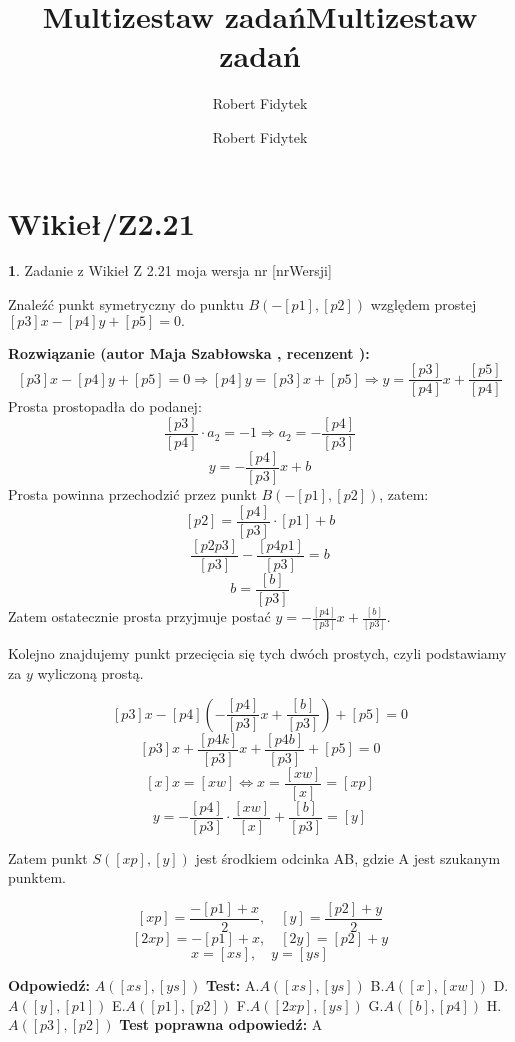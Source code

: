 \documentclass[12pt, a4paper]{article}
\title{Multizestaw zadań}
\author{Robert Fidytek}
\date{}\documentclass[12pt, a4paper]{article}
\title{Multizestaw zadań}
\author{Robert Fidytek}
\date{}
\theoremstyle{definition} %
\newtheorem{zad}{}
\theoremstyle{definition} %
\newtheorem{zad}{}
\newcommand{\kategoria}[1]{\section{#1}} %
\newcommand{\zadStart}[1]{\begin{zad}#1\newline} %
\newcommand{\zadStop}{\end{zad}}   %
\newcommand{\rozwStart}[2]{\noindent \textbf{Rozwiązanie (autor #1 , recenzent #2): }\newline} %
\newcommand{\rozwStop}{\newline}                                            %
\newcommand{\odpStart}{\noindent \textbf{Odpowiedź:}\newline}    %
\newcommand{\odpStop}{\newline}                                             %
\newcommand{\testStart}{\noindent \textbf{Test:}\newline} %
\newcommand{\testStop}{\newline} %
\newcommand{\kluczStart}{\noindent \textbf{Test poprawna odpowiedź:}\newline} %
\newcommand{\kluczStop}{\newline} %
\begin{document}
\maketitle


\kategoria{Wikieł/Z2.21}
\zadStart{Zadanie z Wikieł Z 2.21  moja wersja nr [nrWersji]}

Znaleźć punkt symetryczny do punktu $B(-[p1],[p2])$ względem prostej $[p3]x-[p4]y+[p5]=0.$
\zadStop

\rozwStart{Maja Szabłowska}{}
$$[p3]x-[p4]y+[p5]=0 \Rightarrow [p4]y=[p3]x+[p5] \Rightarrow y=\frac{[p3]}{[p4]}x+\frac{[p5]}{[p4]}$$
Prosta prostopadła do podanej:
$$\frac{[p3]}{[p4]}\cdot a_{2}=-1 \Rightarrow a_{2}=-\frac{[p4]}{[p3]}$$
 $$y=-\frac{[p4]}{[p3]}x+b$$
 Prosta powinna przechodzić przez punkt $B(-[p1],[p2])$, zatem:
 $$[p2]=\frac{[p4]}{[p3]}\cdot [p1] +b$$
 $$\frac{[p2p3]}{[p3]}-\frac{[p4p1]}{[p3]}=b$$
 $$b=\frac{[b]}{[p3]}$$
 Zatem ostatecznie prosta przyjmuje postać $y=-\frac{[p4]}{[p3]}x+\frac{[b]}{[p3]}.$
 
Kolejno znajdujemy punkt przecięcia się tych dwóch prostych, czyli podstawiamy za $y$ wyliczoną prostą.

$$[p3]x-[p4]\left(-\frac{[p4]}{[p3]}x+\frac{[b]}{[p3]}\right)+[p5]=0$$
$$[p3]x+\frac{[p4k]}{[p3]}x+\frac{[p4b]}{[p3]}+[p5]=0$$
$$[x]x=[xw] \iff x=\frac{[xw]}{[x]}=[xp]$$
$$y=-\frac{[p4]}{[p3]}\cdot\frac{[xw]}{[x]}+\frac{[b]}{[p3]}=[y]$$

Zatem punkt $S([xp],[y])$ jest środkiem odcinka AB, gdzie A jest szukanym punktem.

$$[xp]=\frac{-[p1]+x}{2}, \quad [y]=\frac{[p2]+y}{2}$$
$$[2xp]=-[p1]+x, \quad [2y]=[p2]+y$$
$$x=[xs], \quad y=[ys]$$

\rozwStop


\odpStart
$A([xs],[ys])$
\odpStop
\testStart
A.$A([xs],[ys])$
B.$A([x],[xw])$
D.$A([y],[p1])$
E.$A([p1],[p2])$
F.$A([2xp],[ys])$
G.$A([b],[p4])$
H.$A([p3],[p2])$
\testStop
\kluczStart
A
\kluczStop
\end{document}
